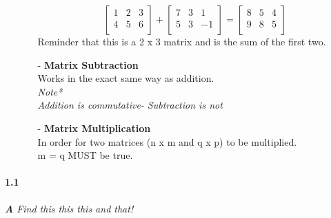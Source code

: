\documentclass[12pt]{article}
\begin{document}
\begin{flushleft}
\begin{itemize}
\begin{flushleft}
\begin{itemize}
		$$\begin{bmatrix}
			1 & 2  & 3 \\
			4 & 5 & 6 \\
		\end{bmatrix}
	+  \begin{bmatrix}
		7 & 3  & 1 \\
		5 & 3 & -1\\
	\end{bmatrix}
= \begin{bmatrix}
	8 & 5  & 4 \\
	9 & 8 & 5 \\
\end{bmatrix} $$
Reminder that this is a 2 x 3 matrix and is the sum of the first two.\\
\item[-] \textbf{Matrix Subtraction} \\ Works in the exact same way as addition. \\

\textit{Note* \\Addition is commutative- Subtraction is not}\\

\item[-] \textbf{Matrix Multiplication}\\
In order for two matrices (n x m and q x p) to be multiplied. \\
m = q MUST be true. \\



	\end{itemize}
\end{flushleft}
		
		
		
		\end{itemize}
	\end{flushleft}
	
	
	\paragraph{1.1}
	\textit{
		\textbf{A}	Find this this this and that!
	}
\end{document}
